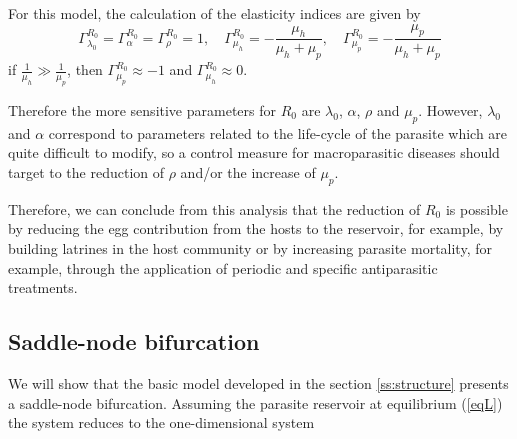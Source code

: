 \documentclass[eng]{MMSB-class-eng}
\begin{document}
For this model, the calculation of the elasticity indices are given by	
\begin{equation}
\Gamma^{R_0}_{\lambda_0}=\Gamma^{R_0}_{\alpha}=\Gamma^{R_0}_{\rho}=1, 
\quad \Gamma^{R_0}_{\mu_h}=-\dfrac{\mu_h}{\mu_{h}+\mu_p},
\quad \Gamma^{R_0}_{\mu_p}=-\dfrac{\mu_p}{\mu_{h}+\mu_p}
\end{equation}
if $\frac{1}{\mu_h} \gg \frac{1}{\mu_p}$, then $\Gamma^{R_0}_{\mu_p}\approx -1$
and 
$\Gamma^{R_0}_{\mu_h}\approx 0$.

Therefore the more sensitive parameters for $R_0$ are $\lambda_0$, $\alpha$, $\rho$ and $\mu_p$.
However, $\lambda_0$ and $\alpha$ correspond to parameters related to the life-cycle of the parasite which are quite difficult to modify, so a control measure for macroparasitic diseases should target to the reduction of $\rho$ and/or the increase of $\mu_p$.

Therefore, we can conclude from this analysis that the reduction of $R_0$ 
is possible by reducing the egg contribution from the hosts to the reservoir, for example, by building latrines in the host community or by increasing parasite mortality, for example, through the application of periodic and specific antiparasitic treatments.

\subsection{Saddle-node bifurcation}\label{bifurcacion}
We will show that the basic model developed in the section \ref{ss:structure} presents a saddle-node bifurcation. Assuming the parasite reservoir at equilibrium (\ref{eqL})  the system reduces to the one-dimensional system 
\end{document}
